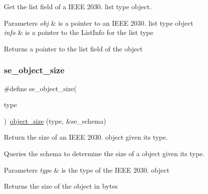 Get the list field of a I\+E\+EE 2030. list type object. 


\begin{DoxyParams}{Parameters}
{\em obj} & is a pointer to an I\+E\+EE 2030. list type object \\
\hline
{\em info} & is a pointer to the List\+Info for the list type \\
\hline
\end{DoxyParams}
\begin{DoxyReturn}{Returns}
a pointer to the list field of the object 
\end{DoxyReturn}
\mbox{\label{group__se__object_ga8e501f611d4bebae2149ca3fdd8cd930}} 
\subsubsection{\texorpdfstring{se\+\_\+object\+\_\+size}{se\_object\_size}}
{\footnotesize\ttfamily \#define se\+\_\+object\+\_\+size(\begin{DoxyParamCaption}\item[{}]{type }\end{DoxyParamCaption})~\hyperlink{group__schema_ga4c9e71b8c2112dfc32414022942618de}{object\+\_\+size} (type, \&se\+\_\+schema)}



Return the size of an I\+E\+EE 2030. object given its type. 

Queries the schema to determine the size of a object given its type. 
\begin{DoxyParams}{Parameters}
{\em type} & is the type of the I\+E\+EE 2030. object \\
\hline
\end{DoxyParams}
\begin{DoxyReturn}{Returns}
the size of the object in bytes 
\end{DoxyReturn}
\mbox{\label{group__se__object_ga6a18ca73ed2f7d19fe79cf78283e9f2c}} 
